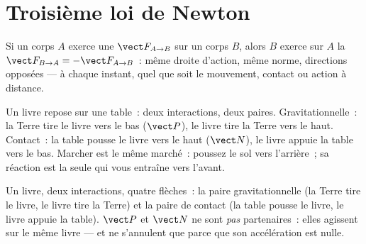 \section{Troisième loi de Newton}

\begin{theorem}\label{thm:g12:newtons-laws:third}
Si un corps $A$ exerce une  $\vect F_{A \to B}$ sur un
corps $B$, alors $B$ exerce sur $A$ la 
$\vect F_{B \to A} = -\vect F_{A \to B}$~: même droite d'action, même
norme, directions opposées --- à chaque instant, quel que soit le
mouvement, contact ou action à distance.
\end{theorem}
\admitted

\begin{example}\label{ex:g12:newtons-laws:book}
Un livre repose sur une table~: deux interactions, deux paires.
Gravitationnelle~: la Terre tire le livre vers le bas ($\vect P$), le
livre tire la Terre vers le haut. Contact~: la table pousse le livre
vers le haut ($\vect N$), le livre appuie la table vers le bas. Marcher
est le même marché~: poussez le sol vers l'arrière~; sa réaction est la
seule  qui vous entraîne vers l'avant.
\end{example}


\begin{omfigure}

{\small Un livre, deux interactions, quatre flèches~: la paire
gravitationnelle (la Terre tire le livre, le livre tire la Terre) et la
paire de contact (la table pousse le livre, le livre appuie la table).
$\vect P$ et $\vect N$ ne sont \emph{pas} partenaires~: elles agissent
sur le même livre --- et ne s'annulent que parce que son accélération
est nulle.}
\end{omfigure}

